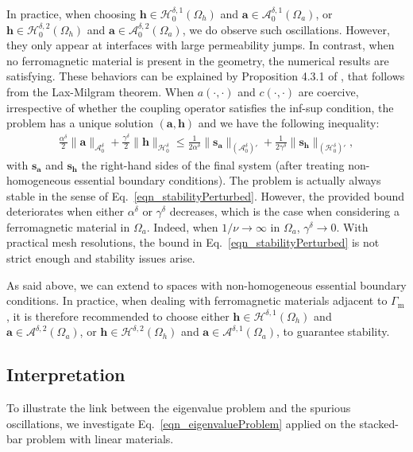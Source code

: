 \documentclass[journal]{IEEEtran}
\renewcommand{\vec}[1]{\boldsymbol{#1}} %
\renewcommand{\a}{\vec a}
\newcommand{\h}{\vec h}
\newcommand{\Oa}{\Omega_a}
\newcommand{\Oh}{\Omega_h}
\newcommand{\Gm}{\Gamma_\text{m}}
\newcommand{\hspzd}{\mathcal{H}_{0}^{\delta}}
\newcommand{\aspzd}{\mathcal{A}_{0}^{\delta}}
\newcommand{\hspdone}{\mathcal{H}^{\delta,1}}
\newcommand{\aspdone}{\mathcal{A}^{\delta,1}}
\newcommand{\hspdtwo}{\mathcal{H}^{\delta,2}}
\newcommand{\aspdtwo}{\mathcal{A}^{\delta,2}}
\newcommand{\hspzdone}{\mathcal{H}_{0}^{\delta,1}}
\newcommand{\aspzdone}{\mathcal{A}_{0}^{\delta,1}}
\newcommand{\hspzdtwo}{\mathcal{H}_{0}^{\delta,2}}
\newcommand{\aspzdtwo}{\mathcal{A}_{0}^{\delta,2}}
\begin{document}
In practice, when choosing $\h \in \hspzdone(\Oh)$ and $\a \in \aspzdone(\Oa)$, or $\h \in \hspzdtwo(\Oh)$ and $\a \in \aspzdtwo(\Oa)$, we do observe such oscillations. However, they only appear at interfaces with large permeability jumps. In contrast, when no ferromagnetic material is present in the geometry, the numerical results are satisfying. These behaviors can be explained by Proposition 4.3.1 of \cite{brezziBook}, that follows from the Lax-Milgram theorem. When $a(\cdot,\cdot)$ and $c(\cdot,\cdot)$ are coercive, irrespective of whether the coupling operator satisfies the inf-sup condition, the problem has a unique solution $(\a,\h)$ and we have the following inequality:
\begin{align}\label{eqn_stabilityPerturbed}
\frac{\alpha^\delta}{2}\|\a \|_{\aspzd} + \frac{\gamma^\delta}{2}\| \h \|_{\hspzd} \le \frac{1}{2\alpha^\delta} \|\vec{s}_{\a} \|_{(\aspzd)'} +\frac{1}{2\gamma^\delta} \| \vec{s}_{\h} \|_{(\hspzd)'},
\end{align}
with $\vec{s}_{\a}$ and $\vec{s}_{\h}$ the right-hand sides of the final system (after treating non-homogeneous essential boundary conditions). The problem is actually always stable in the sense of Eq.~\eqref{eqn_stabilityPerturbed}. However, the provided bound deteriorates when either $\alpha^\delta$ or $\gamma^\delta$ decreases, which is the case when considering a ferromagnetic material in $\Oa$. Indeed, when $1/\nu \to \infty$ in $\Oa$, $\gamma^\delta\to 0$. With practical mesh resolutions, the bound in Eq.~\eqref{eqn_stabilityPerturbed} is not strict enough and stability issues arise.

As said above, we can extend to spaces with non-homogeneous essential boundary conditions. In practice, when dealing with ferromagnetic materials adjacent to $\Gm$, it is therefore recommended to choose either $\h \in \hspdone(\Oh)$ and $\a \in \aspdtwo(\Oa)$, or $\h \in \hspdtwo(\Oh)$ and $\a \in \aspdone(\Oa)$, to guarantee stability.

\subsection{Interpretation}

To illustrate the link between the eigenvalue problem and the spurious oscillations, we investigate Eq.~\eqref{eqn_eigenvalueProblem} applied on the stacked-bar problem with linear materials.
\end{document}
